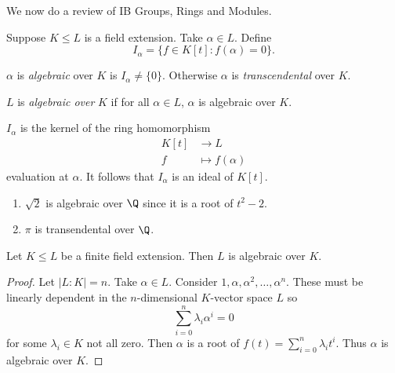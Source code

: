 \documentclass[a4paper]{article}
\begin{document}
We now do a review of IB Groups, Rings and Modules.

Suppose \(K \leq L\) is a field extension. Take \(\alpha \in L\). Define
\[
  I_\alpha = \{f \in K[t]: f(\alpha) = 0\}.
\]

\begin{definition}
  \(\alpha\) is \emph{algebraic} over \(K\) is \(I_\alpha \neq \{0\}\). Otherwise \(\alpha\) is \emph{transcendental} over \(K\).
\end{definition}

\begin{definition}
  \(L\) is \emph{algebraic over} \(K\) if for all \(\alpha \in L\), \(\alpha\) is algebraic over \(K\).
\end{definition}

\begin{remark}
  \(I_\alpha\) is the kernel of the ring homomorphism
  \begin{align*}
    K[t] &\to L \\
    f &\mapsto f(\alpha)
  \end{align*}
  evaluation at \(\alpha\). It follows that \(I_\alpha\) is an ideal of \(K[t]\).
\end{remark}

\begin{eg}\leavevmode
  \begin{enumerate}
  \item \(\sqrt 2\) is algebraic over \(\Q\) since it is a root of \(t^2 - 2\).
  \item \(\pi\) is transendental over \(\Q\).
  \end{enumerate}
\end{eg}

\begin{lemma}
  Let \(K \leq L\) be a finite field extension. Then \(L\) is algebraic over \(K\).
\end{lemma}

\begin{proof}
  Let \(|L:K| = n\). Take \(\alpha \in L\). Consider \(1, \alpha, \alpha^2, \dots, \alpha^n\). These must be linearly dependent in the \(n\)-dimensional \(K\)-vector space \(L\) so
  \[
    \sum_{i = 0}^n \lambda_i\alpha^i = 0
  \]
  for some \(\lambda_i \in K\) not all zero. Then \(\alpha\) is a root of \(f(t) = \sum_{i = 0}^n \lambda_it^i\). Thus \(\alpha\) is algebraic over \(K.\)
\end{proof}
\end{document}
